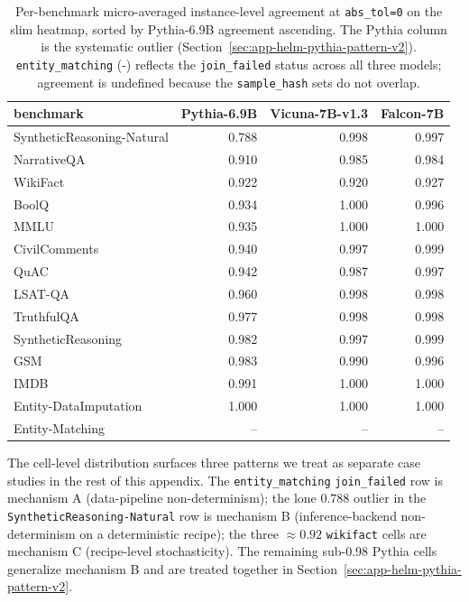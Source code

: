 \begin{table}[htbp]
\centering
\small
\caption{Per-benchmark micro-averaged instance-level agreement at \texttt{abs\_tol=0}
  on the slim heatmap, sorted by Pythia-6.9B agreement ascending.
The Pythia column is the systematic outlier
  (Section~\ref{sec:app-helm-pythia-pattern-v2}).
\texttt{entity\_matching} (-) reflects the \texttt{join\_failed} status
  across all three models; agreement is undefined because the
  \texttt{sample\_hash} sets do not overlap.}
\label{tab:helm-perbench-v2}
\begin{tabular}{lrrr}
\toprule
benchmark & Pythia-6.9B & Vicuna-7B-v1.3 & Falcon-7B \\
\midrule
SyntheticReasoning-Natural & 0.788 & 0.998 & 0.997 \\
NarrativeQA                & 0.910 & 0.985 & 0.984 \\
WikiFact                   & 0.922 & 0.920 & 0.927 \\
BoolQ                      & 0.934 & 1.000 & 0.996 \\
MMLU                       & 0.935 & 1.000 & 1.000 \\
CivilComments              & 0.940 & 0.997 & 0.999 \\
QuAC                       & 0.942 & 0.987 & 0.997 \\
LSAT-QA                    & 0.960 & 0.998 & 0.998 \\
TruthfulQA                 & 0.977 & 0.998 & 0.998 \\
SyntheticReasoning         & 0.982 & 0.997 & 0.999 \\
GSM                        & 0.983 & 0.990 & 0.996 \\
IMDB                       & 0.991 & 1.000 & 1.000 \\
Entity-DataImputation      & 1.000 & 1.000 & 1.000 \\
\midrule
Entity-Matching            & --    & --    & --    \\
\bottomrule
\end{tabular}
\end{table}

The cell-level distribution surfaces three patterns we treat as
  separate case studies in the rest of this appendix.
The \texttt{entity\_matching} \texttt{join\_failed} row is mechanism A
  (data-pipeline non-determinism); the lone $0.788$ outlier in the
  \texttt{SyntheticReasoning-Natural} row is mechanism B
  (inference-backend non-determinism on a deterministic recipe); the
  three $\approx 0.92$ \texttt{wikifact} cells are mechanism C (recipe-level
  stochasticity).
The remaining sub-0.98 Pythia cells generalize mechanism B and are
  treated together in
  Section~\ref{sec:app-helm-pythia-pattern-v2}.

